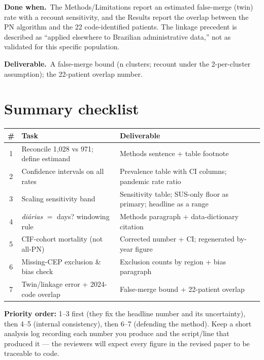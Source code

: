\documentclass[11pt,a4paper]{article}
\newcommand{\done}{\textbf{Done when.}\ }
\newcommand{\out}{\textbf{Deliverable.}\ }
\begin{document}
\done The Methods/Limitations report an estimated false-merge (twin) rate with a recount
sensitivity, and the Results report the overlap between the PN algorithm and the 22
code-identified patients. The linkage precedent is described as ``applied elsewhere to Brazilian
administrative data,'' not as validated for this specific population.

\out A false-merge bound (n clusters; recount under the 2-per-cluster assumption); the
22-patient overlap number.

\section*{Summary checklist}

\begin{longtable}{@{}c p{5.2cm} p{6.0cm}@{}}
\toprule
\textbf{\#} & \textbf{Task} & \textbf{Deliverable} \\
\midrule
\endhead
1 & Reconcile 1{,}028 vs 971; define estimand & Methods sentence + table footnote \\
2 & Confidence intervals on all rates & Prevalence table with CI columns; pandemic rate ratio \\
3 & Scaling sensitivity band & Sensitivity table; SUS-only floor as primary; headline as a range \\
4 & \emph{di\'{a}rias} $=$ days? windowing rule & Methods paragraph + data-dictionary citation \\
5 & CIF-cohort mortality (not all-PN) & Corrected number + CI; regenerated by-year figure \\
6 & Missing-CEP exclusion \& bias check & Exclusion counts by region + bias paragraph \\
7 & Twin/linkage error + 2024-code overlap & False-merge bound + 22-patient overlap \\
\bottomrule
\end{longtable}

\noindent\textbf{Priority order:} 1--3 first (they fix the headline number and its
uncertainty), then 4--5 (internal consistency), then 6--7 (defending the method). Keep a short
analysis log recording each number you produce and the script/line that produced it --- the
reviewers will expect every figure in the revised paper to be traceable to code.
\end{document}
